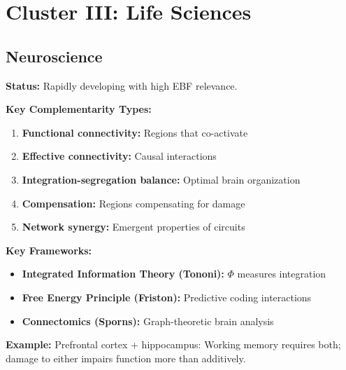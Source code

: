 \section{Cluster III: Life Sciences}
\label{sec:life}

\subsection{Neuroscience}
\label{sec:neuro}

\begin{tcolorbox}[colback=pink!5!white,colframe=pink!75!black,title=\textbf{Neuroscience: Neural Network Complementarity}]

\textbf{Status:} Rapidly developing with high EBF relevance.

\textbf{Key Complementarity Types:}
\begin{enumerate}[noitemsep]
    \item \textbf{Functional connectivity:} Regions that co-activate
    \item \textbf{Effective connectivity:} Causal interactions
    \item \textbf{Integration-segregation balance:} Optimal brain organization
    \item \textbf{Compensation:} Regions compensating for damage
    \item \textbf{Network synergy:} Emergent properties of circuits
\end{enumerate}

\textbf{Key Frameworks:}
\begin{itemize}[noitemsep]
    \item \textbf{Integrated Information Theory (Tononi):} $\Phi$ measures integration
    \item \textbf{Free Energy Principle (Friston):} Predictive coding interactions
    \item \textbf{Connectomics (Sporns):} Graph-theoretic brain analysis
\end{itemize}

\textbf{Example:}
Prefrontal cortex + hippocampus: Working memory requires both; damage to either impairs function more than additively.

\end{tcolorbox}

